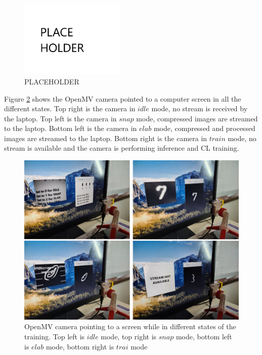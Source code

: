 \documentclass[12pt]{report}
\begin{document}
\begin{figure}[h!]
    \centering
    \includegraphics[width=50mm]{Figures/Chapter4/PLACEHOLDER.jpg} 
    \caption{PLACEHOLDER}
    \label{fig:python_openmv_diagram}    
\end{figure}

Figure \ref{fig:openmv_training} shows the OpenMV camera pointed to a computer screen in all the different states. Top right is the camera in $idle$ mode, no stream is received by the laptop. Top left is the camera in $snap$ mode, compressed images are streamed to the laptop. Bottom left is the camera in $elab$ mode, compressed and processed images are streamed to the laptop. Bottom right is the camera in $train$ mode, no stream is available and the camera is performing inference and CL training.

\begin{figure}[h!]
    \centering
    \includegraphics[width=130mm]{Figures/Chapter4/openmv_training.jpg} 
    \caption{OpenMV camera pointing to a screen while in different states of the training. Top left is $idle$ mode, top right is $snap$ mode, bottom left is $elab$ mode, bottom right is $trai$ mode}
    \label{fig:openmv_training}    
\end{figure}
\end{document}
